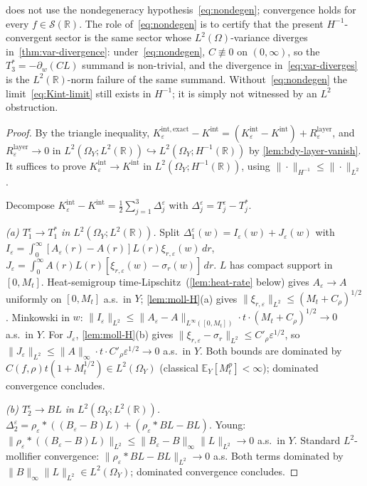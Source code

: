 \documentclass[EJP]{ejpecp}
\newcommand{\R}{\mathbb{R}}
\renewcommand{\E}{\mathbb{E}}
\begin{document}
 does not use the nondegeneracy
hypothesis~\eqref{eq:nondegen}; convergence holds for every
$f\in\mathscr S(\R)$. The role of~\eqref{eq:nondegen} is to certify
that the present $H^{-1}$-convergent sector is the same sector whose
$L^{2}(\Omega)$-variance diverges in~\cref{thm:var-divergence}:
under~\eqref{eq:nondegen}, $C\not\equiv 0$ on $(0,\infty)$, so the
$T_3^{*}=-\partial_w(CL)$ summand is non-trivial, and the divergence
in~\eqref{eq:var-diverges} is the $L^{2}(\R)$-norm failure of the
same summand. Without~\eqref{eq:nondegen} the
limit~\eqref{eq:Kint-limit} still exists in $H^{-1}$; it is simply
not witnessed by an $L^{2}$ obstruction.

\begin{proof}
By the triangle inequality,
$K_\varepsilon^{\mathrm{int,exact}}-K^{\mathrm{int}}
=(K_\varepsilon^{\mathrm{int}}-K^{\mathrm{int}})+R_\varepsilon^{\mathrm{layer}}$,
and $R_\varepsilon^{\mathrm{layer}}\to 0$ in
$L^{2}(\Omega_Y;L^{2}(\R))\hookrightarrow L^{2}(\Omega_Y;H^{-1}(\R))$
by \cref{lem:bdy-layer-vanish}. It suffices to prove
$K_\varepsilon^{\mathrm{int}}\to K^{\mathrm{int}}$ in
$L^{2}(\Omega_Y;H^{-1}(\R))$, using
$\|\cdot\|_{H^{-1}}\le\|\cdot\|_{L^{2}}$.

Decompose
$K_\varepsilon^{\mathrm{int}}-K^{\mathrm{int}}=\tfrac12\sum_{j=1}^{3}\Delta_j^{\varepsilon}$
with $\Delta_j^{\varepsilon}=T_j^{\varepsilon}-T_j^{*}$.

\emph{(a) $T_1^{\varepsilon}\to T_1^{*}$ in $L^{2}(\Omega_Y;L^{2}(\R))$.}
Split $\Delta_1^{\varepsilon}(w)=I_\varepsilon(w)+J_\varepsilon(w)$
with
$I_\varepsilon=\int_0^\infty[A_\varepsilon(r)-A(r)]L(r)\xi_{r,\varepsilon}(w)\,dr$,
$J_\varepsilon=\int_0^\infty A(r)L(r)[\xi_{r,\varepsilon}(w)-\sigma_r(w)]\,dr$.
$L$ has compact support in $[0,M_t]$. Heat-semigroup
time-Lipschitz~(\cref{lem:heat-rate} below) gives
$A_\varepsilon\to A$ uniformly on $[0,M_t]$ a.s.\ in $Y$;
\cref{lem:moll-H}(a) gives
$\|\xi_{r,\varepsilon}\|_{L^{2}}\le(M_t+C_\rho)^{1/2}$. Minkowski in
$w$:
$\|I_\varepsilon\|_{L^{2}}\le\|A_\varepsilon-A\|_{L^{\infty}([0,M_t])}\cdot t\cdot(M_t+C_\rho)^{1/2}\to 0$
a.s.\ in $Y$. For $J_\varepsilon$, \cref{lem:moll-H}(b) gives
$\|\xi_{r,\varepsilon}-\sigma_r\|_{L^{2}}\le C'_\rho\varepsilon^{1/2}$,
so $\|J_\varepsilon\|_{L^{2}}\le\|A\|_\infty\cdot t\cdot C'_\rho\varepsilon^{1/2}\to 0$
a.s.\ in $Y$. Both bounds are dominated by
$C(f,\rho)t(1+M_t^{1/2})\in L^{2}(\Omega_Y)$ (classical
$\E_Y[M_t^{p}]<\infty$); dominated convergence concludes.

\emph{(b) $T_2^{\varepsilon}\to BL$ in $L^{2}(\Omega_Y;L^{2}(\R))$.}
$\Delta_2^{\varepsilon}=\rho_\varepsilon*((B_\varepsilon-B)L)+(\rho_\varepsilon*BL-BL)$.
Young: $\|\rho_\varepsilon*((B_\varepsilon-B)L)\|_{L^{2}}\le\|B_\varepsilon-B\|_\infty\|L\|_{L^{2}}\to 0$
a.s.\ in $Y$. Standard $L^{2}$-mollifier convergence:
$\|\rho_\varepsilon*BL-BL\|_{L^{2}}\to 0$ a.s. Both terms dominated
by $\|B\|_\infty\|L\|_{L^{2}}\in L^{2}(\Omega_Y)$; dominated
convergence concludes.


\end{proof}
\end{document}
